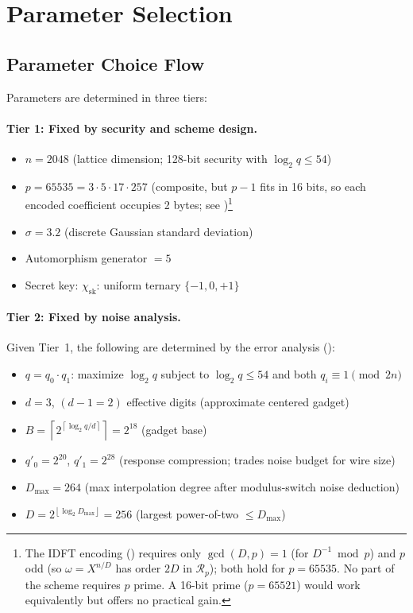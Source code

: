 \documentclass[11pt,a4paper]{article}
\newcommand{\R}{\mathcal{R}}
\newcommand{\Rp}{\R_{p}}
\newcommand{\floor}[1]{\left\lfloor #1 \right\rfloor}
\newcommand{\ceil}[1]{\left\lceil #1 \right\rceil}
\begin{document}
\section{Parameter Selection}\label{sec:param-select}

\subsection{Parameter Choice Flow}\label{sec:param-flow}

Parameters are determined in three tiers:

\paragraph{Tier 1: Fixed by security and scheme design.}
\begin{itemize}[nosep]
    \item $n = 2048$ (lattice dimension; 128-bit security with $\log_2 q \le 54$)
    \item $p = 65535 = 3 \cdot 5 \cdot 17 \cdot 257$ (composite, but $p\!-\!1$ fits in 16 bits, so each encoded coefficient occupies 2 bytes; see )\footnote{The IDFT encoding () requires only $\gcd(D, p) = 1$ (for $D^{-1} \bmod p$) and $p$ odd (so $\omega = X^{n/D}$ has order $2D$ in $\Rp$); both hold for $p = 65535$. No part of the scheme requires $p$ prime. A 16-bit prime ($p = 65521$) would work equivalently but offers no practical gain.}
    \item $\sigma = 3.2$ (discrete Gaussian standard deviation)
    \item Automorphism generator $= 5$
    \item Secret key: $\chi_{\mathrm{sk}}$: uniform ternary $\{-1,0,+1\}$
\end{itemize}

\paragraph{Tier 2: Fixed by noise analysis.}
Given Tier~1, the following are determined by the error analysis ():
\begin{itemize}[nosep]
    \item $q = q_0 \cdot q_1$: maximize $\log_2 q$ subject to $\log_2 q \le 54$ and both $q_i \equiv 1 \pmod{2n}$
    \item $d = 3$, $(d-1 = 2)$ effective digits (approximate centered gadget)
    \item $B = \ceil{2^{\ceil{\log_2 q / d}}} = 2^{18}$ (gadget base)
    \item $q'_0 = 2^{20}$, $q'_1 = 2^{28}$ (response compression; trades noise budget for wire size)
    \item $D_{\max} = 264$ (max interpolation degree after modulus-switch noise deduction)
    \item $D = 2^{\floor{\log_2 D_{\max}}} = 256$ (largest power-of-two $\le D_{\max}$)
\end{itemize}
\end{document}
